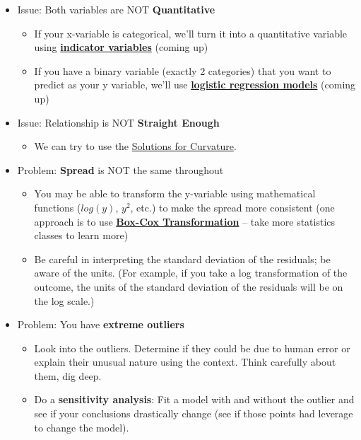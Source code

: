 \documentclass[
]{book}
\providecommand{\tightlist}{%
  \setlength{\itemsep}{0pt}\setlength{\parskip}{0pt}}
\begin{document}
\begin{itemize}
\tightlist
\item
  Issue: Both variables are NOT \textbf{Quantitative}

  \begin{itemize}
  \tightlist
  \item
    If your x-variable is categorical, we'll turn it into a quantitative variable using \protect\hyperlink{indicator-variables}{\textbf{indicator variables}} (coming up)
  \item
    If you have a binary variable (exactly 2 categories) that you want to predict as your y variable, we'll use \protect\hyperlink{logistic}{\textbf{logistic regression models}} (coming up)
  \end{itemize}
\item
  Issue: Relationship is NOT \textbf{Straight Enough}

  \begin{itemize}
  \tightlist
  \item
    We can try to use the \protect\hyperlink{solutions-for-curvature}{Solutions for Curvature}.
  \end{itemize}
\item
  Problem: \textbf{Spread} is NOT the same throughout

  \begin{itemize}
  \tightlist
  \item
    You may be able to transform the y-variable using mathematical functions (\(log(y)\), \(y^2\), etc.) to make the spread more consistent (one approach is to use \href{https://en.wikipedia.org/wiki/Power_transform\#Box\%E2\%80\%93Cox_transformation}{\textbf{Box-Cox Transformation}} -- take more statistics classes to learn more)
  \item
    Be careful in interpreting the standard deviation of the residuals; be aware of the units. (For example, if you take a log transformation of the outcome, the units of the standard deviation of the residuals will be on the log scale.)
  \end{itemize}
\item
  Problem: You have \textbf{extreme outliers}

  \begin{itemize}
  \tightlist
  \item
    Look into the outliers. Determine if they could be due to human error or explain their unusual nature using the context. Think carefully about them, dig deep.
  \item
    Do a \textbf{sensitivity analysis}: Fit a model with and without the outlier and see if your conclusions drastically change (see if those points had leverage to change the model).
  \end{itemize}
\end{itemize}
\end{document}
